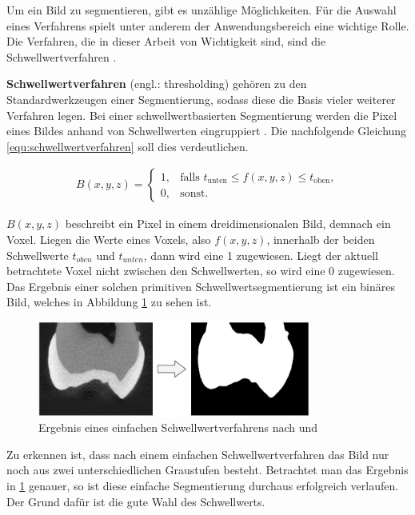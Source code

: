 Um ein Bild zu segmentieren, gibt es unzählige Möglichkeiten. Für die Auswahl
eines Verfahrens spielt unter anderem der Anwendungsbereich eine wichtige Rolle.
Die Verfahren, die in dieser Arbeit von Wichtigkeit sind, sind die Schwellwertverfahren
\citep[vgl.][S.~361]{lehmann2013bildverarbeitung}.

\pagebreak

\textbf{Schwellwertverfahren} (engl.: thresholding) gehören zu den
Standardwerkzeugen einer Segmentierung, sodass diese die Basis vieler weiterer Verfahren
legen. Bei einer schwellwertbasierten Segmentierung werden die Pixel eines
Bildes anhand von Schwellwerten eingruppiert \citep[vgl.][S.~96]{handels2000}.
Die nachfolgende Gleichung \ref{equ:schwellwertverfahren} soll dies
verdeutlichen.

\begin{align}
	\label{equ:schwellwertverfahren}B(x, y, z) = \begin{cases}1,&\text{falls }t_{\text{unten}}\leq f(x, y, z) \leq t_{\text{oben}}, \\ 0,&\text{sonst}.\end{cases}
\end{align}

$B(x, y, z)$ beschreibt ein Pixel in einem dreidimensionalen Bild, demnach ein
Voxel. Liegen die Werte eines Voxels, also $f(x, y, z)$, innerhalb der beiden Schwellwerte
$t_{oben}$ und $t_{unten}$, dann wird eine 1 zugewiesen. Liegt der aktuell betrachtete
Voxel nicht zwischen den Schwellwerten, so wird eine 0 zugewiesen. Das Ergebnis einer
solchen primitiven Schwellwertsegmentierung ist ein binäres Bild, welches in
Abbildung \ref{fig:binäres_schwellwertverfahren} zu sehen ist.

\begin{figure}[h]
	\centering
	\includegraphics[width=0.8\textwidth]{img/beispiel_schwellwertverfahren.png}
	\caption{Ergebnis eines einfachen Schwellwertverfahrens nach \citet{heck2024} und
	\citet{hoffmann2020}}
	\label{fig:binäres_schwellwertverfahren}
\end{figure}

Zu erkennen ist, dass nach einem einfachen Schwellwertverfahren das Bild nur
noch aus zwei unterschiedlichen Graustufen besteht. Betrachtet man das Ergebnis in
\ref{fig:binäres_schwellwertverfahren} genauer, so ist diese einfache
Segmentierung durchaus erfolgreich verlaufen. Der Grund dafür ist die gute Wahl des
Schwellwerts.

